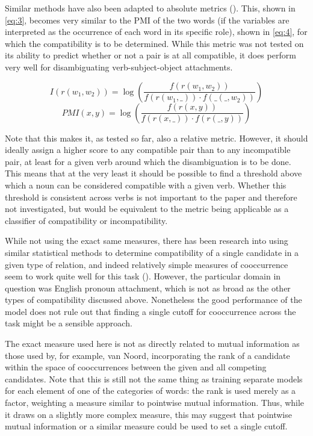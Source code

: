 \documentclass[a4paper, 12pt]{article}
\begin{document}
Similar methods have also been adapted to absolute metrics (\cite{vanNoord}). This, shown in \ref{eq:3}, becomes very similar to the PMI of the two words (if the variables are interpreted as the occurrence of each word in its specific role), shown in \ref{eq:4}, for which the compatibility is to be determined. While this metric was not tested on its ability to predict whether or not a pair is at all compatible, it does perform very well for disambiguating verb-subject-object attachments.

\begin{equation} \label{eq:3}
	I(r(w_1, w_2)) = \log\left(\frac{f(r(w_1, w_2))}{f(r(w_1, \_ )) \cdot f(\_ (\_ , w_2))}\right)
\end{equation}
\begin{equation} \label{eq:4}
	PMI(x, y) = \log\left(\frac{f(r(x, y))}{f(r(x, \_ )) \cdot f(r(\_ , y))}\right)
\end{equation}

Note that this makes it, as tested so far, also a relative metric. However, it should ideally assign a higher score to any compatible pair than to any incompatible pair, at least for a given verb around which the disambiguation is to be done. This means that at the very least it should be possible to find a threshold above which a noun can be considered compatible with a given verb. Whether this threshold is consistent across verbs is not important to the paper and therefore not investigated, but would be equivalent to the metric being applicable as a classifier of compatibility or incompatibility.

While not using the exact same measures, there has been research into using similar statistical methods to determine compatibility of a single candidate in a given type of relation, and indeed relatively simple measures of cooccurrence seem to work quite well for this task (\cite{YangSuTan}). However, the particular domain in question was English pronoun attachment, which is not as broad as the other types of compatibility discussed above. Nonetheless the good performance of the model does not rule out that finding a single cutoff for cooccurrence across the task might be a sensible approach.

The exact measure used here is not as directly related to mutual information as those used by, for example, van Noord, incorporating the rank of a candidate within the space of cooccurrences between the given and all competing candidates. Note that this is still not the same thing as training separate models for each element of one of the categories of words: the rank is used merely as a factor, weighting a measure similar to pointwise mutual information. Thus, while it draws on a slightly more complex measure, this may suggest that pointwise mutual information or a similar measure could be used to set a single cutoff.
\end{document}
